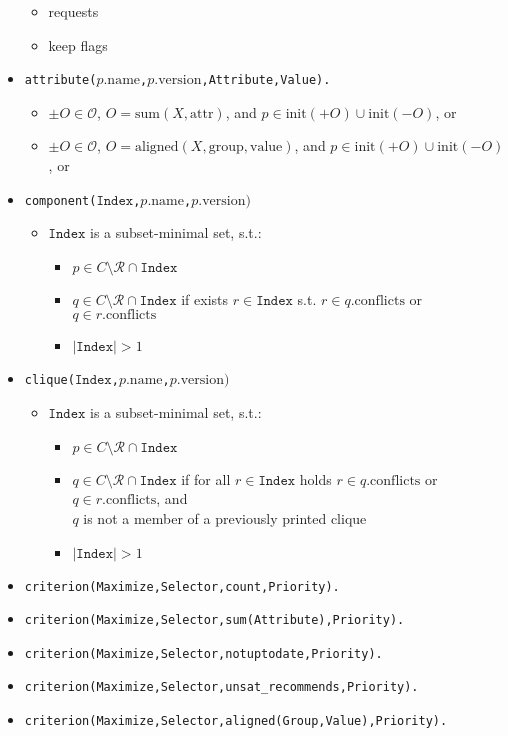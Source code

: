 \documentclass[a4paper,english]{article}
\begin{document}
\begin{itemize}
\begin{itemize}
      \item requests
      \item keep flags
    \end{itemize}
  \item \texttt{attribute($p.\mathrm{name}$,$p.\mathrm{version}$,Attribute,Value).}
    \begin{itemize}
      \item $\pm O\in\mathcal{O}$, $O=\mathrm{sum}(X,\mathrm{attr})$, and $p\in\mathrm{init}({+}O)\cup\mathrm{init}({-}O)$, or
      \item $\pm O\in\mathcal{O}$, $O=\mathrm{aligned}(X,\mathrm{group},\mathrm{value})$, and $p\in\mathrm{init}({+}O)\cup\mathrm{init}({-}O)$, or
    \end{itemize}
  \item \texttt{component($\mathtt{Index}$,$p.\mathrm{name}$,$p.\mathrm{version})$}
    \begin{itemize}
      \item $\mathtt{Index}$ is a subset-minimal set, s.t.:
      \begin{itemize}
        \item $p\in C\setminus\mathcal{R}\cap\mathtt{Index}$
        \item $q\in C\setminus\mathcal{R}\cap\mathtt{Index}$ if exists $r\in\mathtt{Index}$ s.t. $r\in q.\mathrm{conflicts}$ or $q\in r.\mathrm{conflicts}$
        \item $|\mathtt{Index}|>1$
      \end{itemize}
    \end{itemize}
  \item \texttt{clique($\mathtt{Index}$,$p.\mathrm{name}$,$p.\mathrm{version})$}
    \begin{itemize}
      \item $\mathtt{Index}$ is a subset-minimal set, s.t.:
      \begin{itemize}
        \item $p\in C\setminus\mathcal{R}\cap\mathtt{Index}$
        \item $q\in C\setminus\mathcal{R}\cap\mathtt{Index}$ if for all $r\in\mathtt{Index}$ holds $r\in q.\mathrm{conflicts}$ or $q\in r.\mathrm{conflicts}$, and\\$q$ is not a member of a previously printed clique
        \item $|\mathtt{Index}|>1$

      \end{itemize}
    \end{itemize}

  \item \texttt{criterion(Maximize,Selector,count,Priority).}
  \item \texttt{criterion(Maximize,Selector,sum(Attribute),Priority).}
  \item \texttt{criterion(Maximize,Selector,notuptodate,Priority).}
  \item \texttt{criterion(Maximize,Selector,unsat\_recommends,Priority).}
  \item \texttt{criterion(Maximize,Selector,aligned(Group,Value),Priority).}
\end{itemize}
\end{document}
